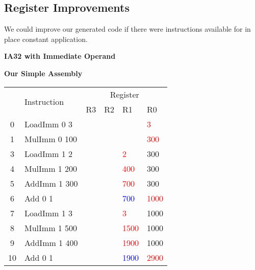 \documentclass{report}
\newcommand{\hot}[1]{\textcolor{red}{#1}}
\newcommand{\old}[1]{\textcolor{blue}{#1}}
\begin{document}
\subsection*{Register Improvements}
We could improve our generated code if there were instructions available for in place constant application.
\\ \begin{minipage}[t]{0.4\textwidth}
	\centerline{\textbf{IA32 with Immediate Operand}}
\end{minipage}
\hfill
\begin{minipage}[t]{0.4\textwidth}
	\centerline{\textbf{Our Simple Assembly}}
\end{minipage}

\begin{center}
	\begin{tabular}{c l | l l l l}
		   & \multirow{2}{*}{Instruction} & \multicolumn{4}{c}{Register}                                \\
		   &                              & R3                           & R2 & R1         & R0         \\
		\hline
		0  & LoadImm 0 3                  &                              &    &            & \hot{3}    \\
		1  & MulImm 0 100                 &                              &    &            & \hot{300}  \\
		3  & LoadImm 1 2                  &                              &    & \hot{2}    & 300        \\
		4  & MulImm 1 200                 &                              &    & \hot{400}  & 300        \\
		5  & AddImm 1 300                 &                              &    & \hot{700}  & 300        \\
		6  & Add 0 1                      &                              &    & \old{700}  & \hot{1000} \\
		7  & LoadImm 1 3                  &                              &    & \hot{3}    & 1000       \\
		8  & MulImm 1 500                 &                              &    & \hot{1500} & 1000       \\
		9  & AddImm 1 400                 &                              &    & \hot{1900} & 1000       \\
		10 & Add 0 1                      &                              &    & \old{1900} & \hot{2900} \\
	\end{tabular}
\end{center}
\end{document}
